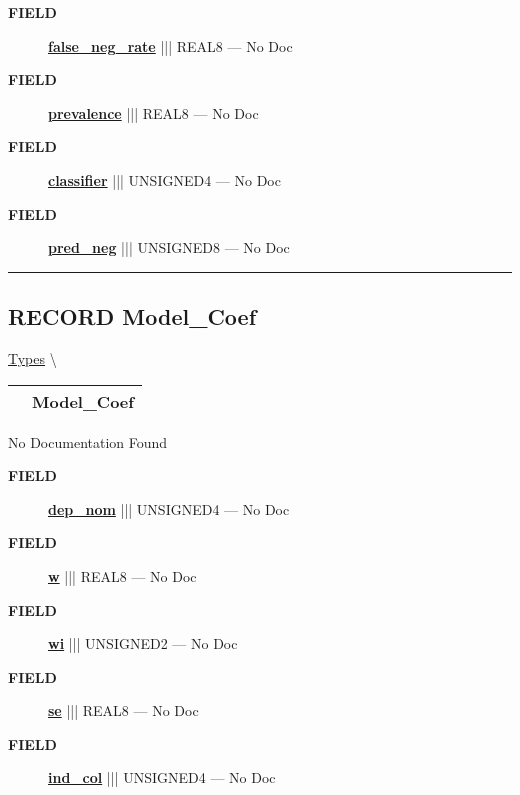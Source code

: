 \begin{description}
\item [\colorbox{tagtype}{\color{white} \textbf{\textsf{FIELD}}}] \textbf{\underline{false\_neg\_rate}} ||| REAL8 --- No Doc
\item [\colorbox{tagtype}{\color{white} \textbf{\textsf{FIELD}}}] \textbf{\underline{prevalence}} ||| REAL8 --- No Doc
\item [\colorbox{tagtype}{\color{white} \textbf{\textsf{FIELD}}}] \textbf{\underline{classifier}} ||| UNSIGNED4 --- No Doc
\item [\colorbox{tagtype}{\color{white} \textbf{\textsf{FIELD}}}] \textbf{\underline{pred\_neg}} ||| UNSIGNED8 --- No Doc
\end{description}





\rule{\linewidth}{0.5pt}
\subsection*{\textsf{\colorbox{headtoc}{\color{white} RECORD}
Model\_Coef}}

\hypertarget{ecldoc:logisticregression.types.model_coef}{}
\hspace{0pt} \hyperlink{ecldoc:LogisticRegression.Types}{Types} \textbackslash 

{\renewcommand{\arraystretch}{1.5}
\begin{tabularx}{\textwidth}{|>{\raggedright\arraybackslash}l|X|}
\hline
\hspace{0pt}\mytexttt{\color{red} } & \textbf{Model\_Coef} \\
\hline
\end{tabularx}
}

\par





No Documentation Found







\par
\begin{description}
\item [\colorbox{tagtype}{\color{white} \textbf{\textsf{FIELD}}}] \textbf{\underline{dep\_nom}} ||| UNSIGNED4 --- No Doc
\item [\colorbox{tagtype}{\color{white} \textbf{\textsf{FIELD}}}] \textbf{\underline{w}} ||| REAL8 --- No Doc
\item [\colorbox{tagtype}{\color{white} \textbf{\textsf{FIELD}}}] \textbf{\underline{wi}} ||| UNSIGNED2 --- No Doc
\item [\colorbox{tagtype}{\color{white} \textbf{\textsf{FIELD}}}] \textbf{\underline{se}} ||| REAL8 --- No Doc
\item [\colorbox{tagtype}{\color{white} \textbf{\textsf{FIELD}}}] \textbf{\underline{ind\_col}} ||| UNSIGNED4 --- No Doc
\end{description}





